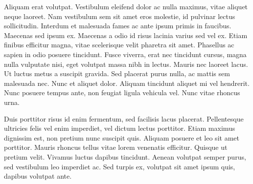 \documentclass[twocolumn]{article}
\begin{document}
	Aliquam erat volutpat. Vestibulum eleifend dolor ac nulla maximus, vitae aliquet neque laoreet. Nam vestibulum sem sit amet eros molestie, id pulvinar lectus sollicitudin. Interdum et malesuada fames ac ante ipsum primis in faucibus. Maecenas sed ipsum ex. Maecenas a odio id risus lacinia varius sed vel ex. Etiam finibus efficitur magna, vitae scelerisque velit pharetra sit amet. Phasellus ac sapien in odio posuere tincidunt. Fusce viverra, erat nec tincidunt cursus, magna nulla vulputate nisi, eget volutpat massa nibh in lectus. Mauris nec laoreet lacus. Ut luctus metus a suscipit gravida. Sed placerat purus nulla, ac mattis sem malesuada nec. Nunc et aliquet dolor. Aliquam tincidunt aliquet mi vel hendrerit. Nunc posuere tempus ante, non feugiat ligula vehicula vel. Nunc vitae rhoncus urna.
	
	Duis porttitor risus id enim fermentum, sed facilisis lacus placerat. Pellentesque ultricies felis vel enim imperdiet, vel dictum lectus porttitor. Etiam maximus dignissim est, non pretium nunc suscipit quis. Aliquam posuere et leo sit amet porttitor. Mauris rhoncus tellus vitae lorem venenatis efficitur. Quisque ut pretium velit. Vivamus luctus dapibus tincidunt. Aenean volutpat semper purus, sed vestibulum leo imperdiet ac. Sed turpis ex, volutpat sit amet ipsum quis, dapibus volutpat ante.
\end{document}
